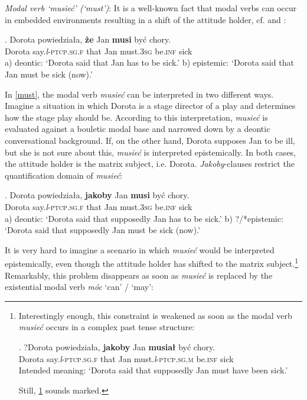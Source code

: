 \documentclass[output=paper
,modfonts
,nonflat]{langsci/langscibook}
\newcommand{\glossformat}[1]{\textsc{#1}}
\newcommand{\thirdperson}{\glossformat{3}\xspace}
\newcommand{\fem}{\glossformat{f}\xspace}
\newcommand{\infv}{\glossformat{inf}\xspace}
\newcommand{\lptcp}{\emph{l}\glossformat{-ptcp}\xspace}
\newcommand{\masc}{\glossformat{m}\xspace}
\newcommand{\sg}{\glossformat{sg}\xspace}
\begin{document}
\emph{Modal verb `musieć' (`must')}: It is a well-known fact that modal verbs can occur in embedded environments resulting in a shift of the attitude holder, cf. \textcite{Hacquard2006} and \textcite{Hacquard-Wellwood2012}:  

\exg.		Dorota powiedziała, \textbf{że} Jan \textbf{musi} być chory. \label{must} \\
		Dorota say.{\lptcp}.{\sg}.{\fem} that Jan must.{\thirdperson}{\sg} be.{\infv} sick \\
		a) deontic: `Dorota said that Jan has to be sick.' \newline
		b) epistemic: `Dorota said that Jan must be sick (now).'
   
In \ref{must}, the modal verb \emph{musieć} can be interpreted in two different ways. Imagine a situation in which Dorota is a stage director of a play and determines how the stage play should be. According to this interpretation, \emph{musieć} is evaluated against a bouletic modal base and narrowed down by a deontic conversational background. If, on the other hand, Dorota supposes Jan to be ill, but she is not sure about this, \emph{musieć} is interpreted epistemically. In both cases, the attitude holder is the matrix subject, i.e. Dorota. \emph{Jakoby}-clauses restrict the quantification domain of \emph{musieć}: 
 
\exg.		Dorota powiedziała, \textbf{jakoby} Jan \textbf{musi} być chory. \\
		Dorota say.{\lptcp}.{\sg}.{\fem} that Jan must.{\thirdperson}{\sg} be.{\infv} sick \\
		a) deontic: `Dorota said that supposedly Jan has to be sick.' \newline
		b) ?/*epistemic: `Dorota said that supposedly Jan must be sick (now).'

It is very hard to imagine a scenario in which \emph{musieć} would be interpreted epistemically, even though the attitude holder has shifted to the matrix subject.\footnote{Interestingly enough, this constraint is weakened as soon as the modal verb \emph{musieć} occurs in a complex past tense structure:

\exg.		?Dorota powiedziała, \textbf{jakoby} Jan \textbf{musiał} być chory. \label{bluh} \\
		Dorota say.{\lptcp}.{\sg}.{\fem} that Jan must.{\lptcp}.{\sg}.{\masc} be.{\infv} sick \\
		Intended meaning: `Dorota said that supposedly Jan must have been sick.'

Still, \ref{bluh} sounds marked. 
}
 Remarkably, this problem disappears as soon as \emph{musieć} is replaced by the existential modal verb \emph{móc} `can' / `may':
\end{document}
